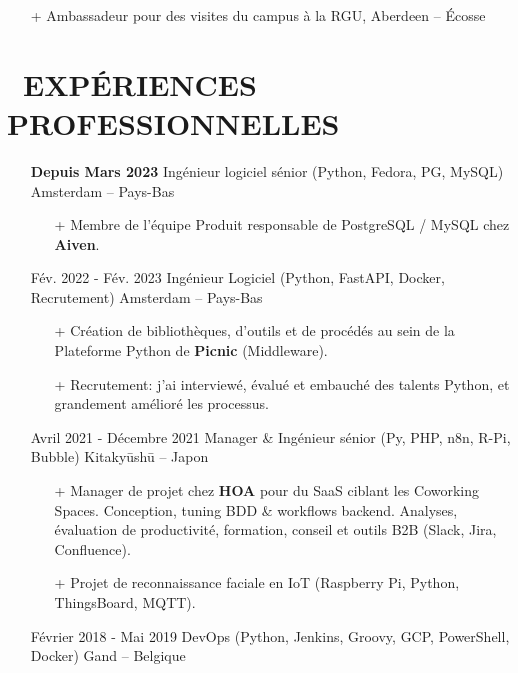 \documentclass{res}
\begin{document}
\begin{resume}
\begin{itemize}
\begin{itemize}
                  \item[+]  Ambassadeur pour des visites du campus \`a la RGU, Aberdeen -- \'Ecosse
		\end{itemize} 
	\end{itemize}

\pagebreak

\section{\faBriefcase~EXP\'ERIENCES PROFESSIONNELLES}

	\begin{itemize}
        \item[] \textbf{Depuis Mars 2023} \tabto{5cm} Ing\'enieur logiciel s\'enior (Python, Fedora, PG, MySQL) \hfill Amsterdam -- Pays-Bas
        \begin{itemize}
            \item[+] Membre de l'\'equipe Produit responsable de PostgreSQL / MySQL chez \textbf{Aiven}.
        \end{itemize}
        \item[] F\'ev. 2022 - F\'ev. 2023 \tabto{5cm} Ing\'enieur Logiciel (Python, FastAPI, Docker, Recrutement) \hfill Amsterdam -- Pays-Bas
		\begin{itemize}
			\item[+] Cr\'eation de biblioth\`eques, d'outils et de proc\'ed\'es au sein de la Plateforme Python de \textbf{Picnic} (Middleware).
			\item[+] Recrutement: j'ai interview\'e, \'evalu\'e et embauch\'e des talents Python, et grandement am\'elior\'e les processus.
		\end{itemize}
		\item[] Avril 2021 - D\'ecembre 2021 \tabto{5cm} Manager \& Ing\'enieur s\'enior (Py, PHP, n8n, R-Pi, Bubble) \hfill Kitaky\=ush\=u -- Japon
		\begin{itemize}
			\item[+] Manager de projet chez \textbf{HOA} pour du SaaS ciblant les Coworking Spaces. Conception, tuning BDD \& workflows backend. Analyses, \'evaluation de productivit\'e, formation, conseil et outils B2B (Slack, Jira, Confluence).
			\item[+] Projet de reconnaissance faciale en IoT (Raspberry Pi, Python, ThingsBoard, MQTT).
		\end{itemize}
		\item[] F\'evrier  2018 - Mai 2019 \tabto{5cm} DevOps (Python, Jenkins, Groovy, GCP, PowerShell, Docker) \hfill Gand -- Belgique

\end{itemize}
\end{resume}
\end{document}
